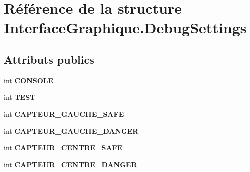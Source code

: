 \hypertarget{struct_interface_graphique_1_1_debug_settings}{\section{Référence de la structure Interface\-Graphique.\-Debug\-Settings}
\label{struct_interface_graphique_1_1_debug_settings}
}
\subsection*{Attributs publics}
\begin{DoxyCompactItemize}
\item 
\hypertarget{struct_interface_graphique_1_1_debug_settings_a67a67736b4e45c7ce270de3317469ada}{int {\bfseries C\-O\-N\-S\-O\-L\-E}}\label{struct_interface_graphique_1_1_debug_settings_a67a67736b4e45c7ce270de3317469ada}

\item 
\hypertarget{struct_interface_graphique_1_1_debug_settings_a6c60bc0916961e2b95ead9e0e70a01b9}{int {\bfseries T\-E\-S\-T}}\label{struct_interface_graphique_1_1_debug_settings_a6c60bc0916961e2b95ead9e0e70a01b9}

\item 
\hypertarget{struct_interface_graphique_1_1_debug_settings_aef2863767ba6b929c2e6f53e166b1cec}{int {\bfseries C\-A\-P\-T\-E\-U\-R\-\_\-\-G\-A\-U\-C\-H\-E\-\_\-\-S\-A\-F\-E}}\label{struct_interface_graphique_1_1_debug_settings_aef2863767ba6b929c2e6f53e166b1cec}

\item 
\hypertarget{struct_interface_graphique_1_1_debug_settings_ac2c8f2082e21c76a4331a0a4db087ef7}{int {\bfseries C\-A\-P\-T\-E\-U\-R\-\_\-\-G\-A\-U\-C\-H\-E\-\_\-\-D\-A\-N\-G\-E\-R}}\label{struct_interface_graphique_1_1_debug_settings_ac2c8f2082e21c76a4331a0a4db087ef7}

\item 
\hypertarget{struct_interface_graphique_1_1_debug_settings_aa3bad45d846437894adeeee56b265d09}{int {\bfseries C\-A\-P\-T\-E\-U\-R\-\_\-\-C\-E\-N\-T\-R\-E\-\_\-\-S\-A\-F\-E}}\label{struct_interface_graphique_1_1_debug_settings_aa3bad45d846437894adeeee56b265d09}

\item 
\hypertarget{struct_interface_graphique_1_1_debug_settings_a53903de990d0f98798d6c8e122935c55}{int {\bfseries C\-A\-P\-T\-E\-U\-R\-\_\-\-C\-E\-N\-T\-R\-E\-\_\-\-D\-A\-N\-G\-E\-R}}\label{struct_interface_graphique_1_1_debug_settings_a53903de990d0f98798d6c8e122935c55}


\end{DoxyCompactItemize}
